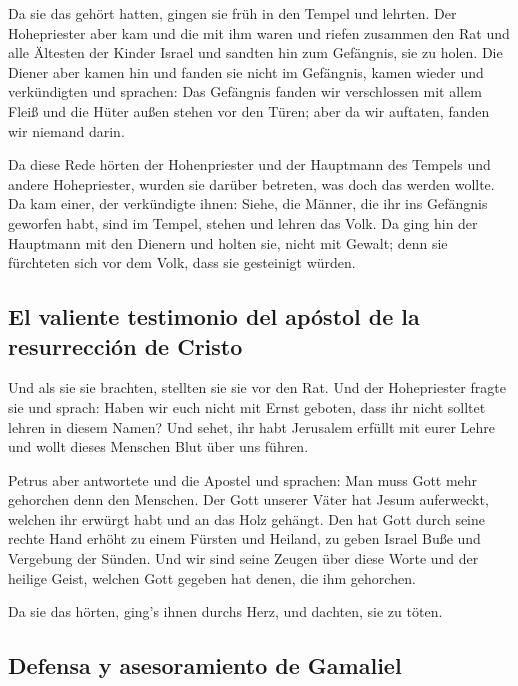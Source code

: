  Da sie das gehört hatten, gingen sie früh in den Tempel
und lehrten. Der Hohepriester aber kam und die mit ihm waren und riefen
zusammen den Rat und alle Ältesten der Kinder Israel und sandten hin zum
Gefängnis, sie zu holen.  Die Diener aber kamen hin und
fanden sie nicht im Gefängnis, kamen wieder und verkündigten
 und sprachen: Das Gefängnis fanden wir verschlossen mit
allem Fleiß und die Hüter außen stehen vor den Türen; aber da wir
auftaten, fanden wir niemand darin.

 Da diese Rede hörten der Hohenpriester und der Hauptmann
des Tempels und andere Hohepriester, wurden sie darüber betreten, was
doch das werden wollte.  Da kam einer, der verkündigte
ihnen: Siehe, die Männer, die ihr ins Gefängnis geworfen habt, sind im
Tempel, stehen und lehren das Volk.  Da ging hin der
Hauptmann mit den Dienern und holten sie, nicht mit Gewalt; denn sie
fürchteten sich vor dem Volk, dass sie gesteinigt würden.

\hypertarget{el-valiente-testimonio-del-apuxf3stol-de-la-resurrecciuxf3n-de-cristo}{%
\subsection{El valiente testimonio del apóstol de la resurrección de
Cristo}\label{el-valiente-testimonio-del-apuxf3stol-de-la-resurrecciuxf3n-de-cristo}}

 Und als sie sie brachten, stellten sie sie vor den Rat.
Und der Hohepriester fragte sie  und sprach: Haben wir
euch nicht mit Ernst geboten, dass ihr nicht solltet lehren in diesem
Namen? Und sehet, ihr habt Jerusalem erfüllt mit eurer Lehre und wollt
dieses Menschen Blut über uns führen.

 Petrus aber antwortete und die Apostel und sprachen: Man
muss Gott mehr gehorchen denn den Menschen.  Der Gott
unserer Väter hat Jesum auferweckt, welchen ihr erwürgt habt und an das
Holz gehängt.  Den hat Gott durch seine rechte Hand
erhöht zu einem Fürsten und Heiland, zu geben Israel Buße und Vergebung
der Sünden.  Und wir sind seine Zeugen über diese Worte
und der heilige Geist, welchen Gott gegeben hat denen, die ihm
gehorchen.

 Da sie das hörten, ging's ihnen durchs Herz, und
dachten, sie zu töten.

\hypertarget{defensa-y-asesoramiento-de-gamaliel}{%
\subsection{Defensa y asesoramiento de
Gamaliel}\label{defensa-y-asesoramiento-de-gamaliel}}

